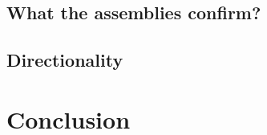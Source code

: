 \documentclass{article}
\begin{document}
\subsection{What the assemblies confirm?}
\subsection{Directionality}
\section{Conclusion}
\newpage

\printbibliography

%






\end{document}
